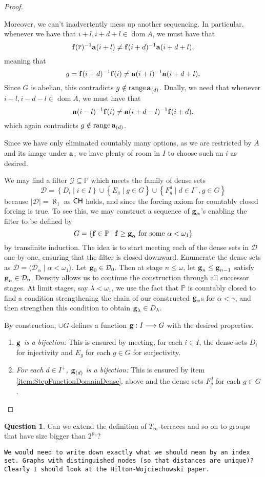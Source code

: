 \documentclass{amsart}
\theoremstyle{definition}
\newtheorem{question}[theorem]{Question}
\theoremstyle{remark}
\renewcommand{\P}{\mathbb{P}}
\newcommand{\CH}{\textup{\textsf{CH}}}
\DeclareMathOperator{\ran}{range}
\DeclareMathOperator{\dom}{dom}
\newcommand{\st}{\; | \;}
\newcommand{\set}[2]{\left\{#1\st #2 \right\}}
\newcommand{\seq}[2]{\langle #1 \st #2 \rangle}
\newcommand{\To}{\longrightarrow}
\renewcommand{\a}{\textup{\textbf{a}}}
\newcommand{\g}{\textup{\textbf{g}}}
\newcommand{\f}{\textup{\textbf{f}}}
\renewcommand{\r}{\overline r}
\begin{document}
\begin{proof}
\begin{enumerate}
	Moreover, we can't inadvertently mess up another sequencing. In particular, whenever we have that $i+l, i+d+l \in \dom A$, we must have that $$\f(\r)^{-1}\a(i+l)\neq \f(i+d)^{-1}\a(i+d+l),$$ meaning that $$g= \f(i+d)^{-1}\f(i) \neq \a(i+l)^{-1}\a(i+d+l).$$ Since $G$ is abelian, this contradicts $g \notin \ran \a_{(d)}$. Dually, we need that whenever $i-l, i-d-l \in \dom A$, we must have that $$\a(i-l)^{-1}\f(i) \neq \a(i+d-l)^{-1}\f(i+d),$$ which again contradicts $g \notin \ran \a_{(d)}$.
	
	Since we have only eliminated countably many options, as we are restricted by $A$ and its image under $\a$, we have plenty of room in $I$ to choose such an $i$ as desired.

\end{enumerate}

We may find a filter $\mathcal G \subseteq \P$ which meets the family of dense sets $$\mathcal D = \set{D_i}{i\in I} \cup \set{E_g}{g \in G} \cup \set{F^d_g}{d \in I^+, g \in G}$$ because $|\mathcal D|=\aleph_1$ as $\CH$ holds, and since the forcing axiom for countably closed forcing is true. To see this, we may construct a sequence of $\g_\alpha$'s enabling the filter to be defined by $$G=\set{\f \in \P}{\f \geq \g_\alpha \text{ for some } \alpha<\omega_1}$$ by transfinite induction. The idea is to start meeting each of the dense sets in $\mathcal D$ one-by-one, ensuring that the filter is closed downward. Enumerate the dense sets as $\mathcal D = \seq{\mathcal D_\alpha}{\alpha<\omega_1}$. Let $\g_0 \in \mathcal D_0$. Then at stage $n \leq \omega$, let $\g_n \leq \g_{n-1}$ satisfy $\g_n \in \mathcal D_n$. Density allows us to continue the construction through all successor stages. At limit stages, say $\lambda <\omega_1$, we use the fact that $\P$ is countably closed to find a condition strengthening the chain of our constructed $\g_\alpha$s for $\alpha<\gamma$, and then strengthen this condition to obtain $\g_\lambda \in D_\lambda$.

By construction, $\cup G$ defines a function $\g: I \To G$ with the desired properties. \begin{enumerate}
	\item \emph{$\g$ is a bijection:} This is ensured by meeting, for each $i \in I$, the dense sets $D_i$ for injectivity and $E_g$ for each $g \in G$  for surjectivity.
	\item \emph{For each $d \in I^+$, $\g_{(d)}$ is a bijection:} This is ensured by item \ref{item:StepFunctionDomainDense}. above and the dense sets $F^d_g$ for each $g \in G$.
\end{enumerate}
\end{proof}


\begin{question} Can we extend the definition of $T_\infty$-terraces and so on to groups that have size bigger than $2^{\aleph_0}$? \end{question}
\texttt{We would need to write down exactly what we should mean by an index set. Graphs with distinguished nodes (so that distances are unique)?} 
\texttt{Clearly I should look at the Hilton-Wojciechowski paper.}



%
\end{document}
